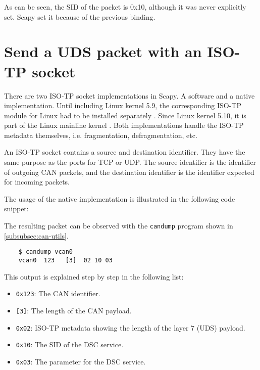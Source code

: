 As can be seen, the SID of the packet is 0x10, although it was never explicitly set. Scapy set it because of the previous binding.


\section{Send a UDS packet with an ISO-TP socket}

There are two ISO-TP socket implementations in Scapy. A software and a native implementation. Until including Linux kernel 5.9, the corresponding ISO-TP module for Linux had to be installed separately \cite{isotp-module}. Since Linux kernel 5.10, it is part of the Linux mainline kernel \cite{isotp-commit}. Both implementations handle the ISO-TP metadata themselves, i.e.  fragmentation, defragmentation, etc.

An ISO-TP socket contains a source and destination identifier. They have the same purpose as the ports for TCP or UDP. The source identifier is the identifier of outgoing CAN packets, and the destination identifier is the identifier expected for incoming packets.

The usage of the native implementation is illustrated in the following code snippet:


The resulting packet can be observed with the \texttt{candump} program shown in \autoref{subsubsec:can-utils}.

\begin{samepage}
\begin{verbatim}
    $ candump vcan0
    vcan0  123   [3]  02 10 03
\end{verbatim}
\end{samepage}

This output is explained step by step in the following list:

\begin{itemize}
    \item \texttt{0x123}: The CAN identifier.
    \item \texttt{[3]}: The length of the CAN payload.
    \item \texttt{0x02}: ISO-TP metadata showing the length of the layer 7 (UDS) payload.
    \item \texttt{0x10}: The SID of the DSC service.
    \item \texttt{0x03}: The parameter for the DSC service.
\end{itemize}

